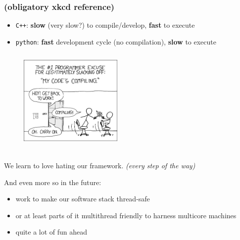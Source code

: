 \documentclass[9pt]{beamer}
\begin{document}
\begin{frame}[fragile]
\frametitle{(obligatory xkcd reference)}


\begin{itemize}
\item \texttt{C++}: \textbf{slow} (very slow?) to compile/develop, \textbf{fast} to execute
\item \texttt{python}: \textbf{fast} development cycle (no compilation), \textbf{slow} to execute
\end{itemize}

\begin{figure}[h]
\begin{center}
\includegraphics[width=5cm,height=5cm]{_figs/xkcd-compiling.png}
\end{center}

\end{figure}


\end{frame}

\begin{frame}[fragile]
\frametitle{}


	We learn to love hating our framework. \emph{(every step of the way)}

	\begin{block}{}
And even more so in the future:


\begin{itemize}
\item work to make our software stack thread-safe
\item or at least parts of it multithread friendly to harness multicore machines
\item quite a lot of fun ahead
\end{itemize}
	\end{block}{}

\end{frame}
\end{document}

